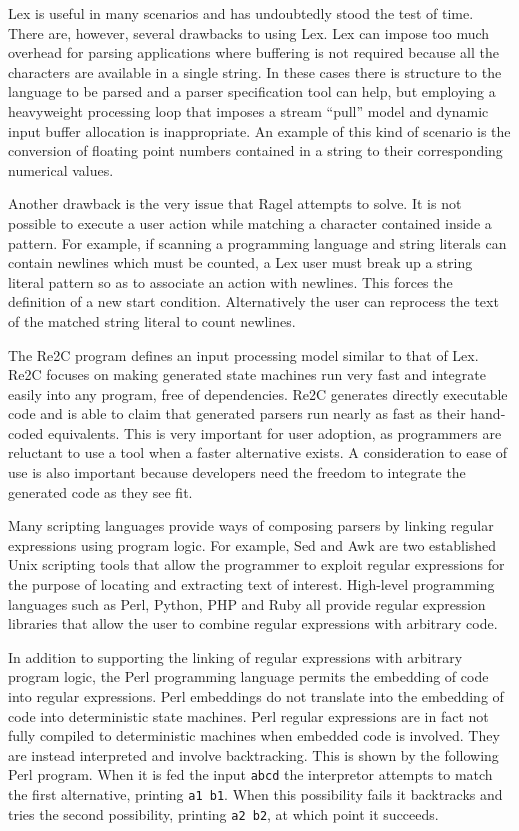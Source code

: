 \documentclass[letterpaper,11pt,oneside]{book}
\begin{document}
Lex is useful in many scenarios and has undoubtedly stood the test of time.
There are, however, several drawbacks to using Lex.  Lex can impose too much
overhead for parsing applications where buffering is not required because all
the characters are available in a single string.  In these cases there is
structure to the language to be parsed and a parser specification tool can
help, but employing a heavyweight processing loop that imposes a stream
``pull'' model and dynamic input buffer allocation is inappropriate.  An
example of this kind of scenario is the conversion of floating point numbers
contained in a string to their corresponding numerical values.

Another drawback is the very issue that Ragel attempts to solve.
It is not possible to execute a user action while
matching a character contained inside a pattern. For example, if scanning a
programming language and string literals can contain newlines which must be
counted, a Lex user must break up a string literal pattern so as to associate
an action with newlines. This forces the definition of a new start condition.
Alternatively the user can reprocess the text of the matched string literal to
count newlines. 


The Re2C program defines an input processing model similar to that of Lex.
Re2C focuses on making generated state machines run very fast and
integrate easily into any program, free of dependencies.  Re2C generates
directly executable code and is able to claim that generated parsers run nearly
as fast as their hand-coded equivalents.  This is very important for user
adoption, as programmers are reluctant to use a tool when a faster alternative
exists.  A consideration to ease of use is also important because developers
need the freedom to integrate the generated code as they see fit. 

Many scripting languages provide ways of composing parsers by linking regular
expressions using program logic. For example, Sed and Awk are two established
Unix scripting tools that allow the programmer to exploit regular expressions
for the purpose of locating and extracting text of interest. High-level
programming languages such as Perl, Python, PHP and Ruby all provide regular
expression libraries that allow the user to combine regular expressions with
arbitrary code.

In addition to supporting the linking of regular expressions with arbitrary
program logic, the Perl programming language permits the embedding of code into
regular expressions. Perl embeddings do not translate into the embedding of
code into deterministic state machines. Perl regular expressions are in fact
not fully compiled to deterministic machines when embedded code is involved.
They are instead interpreted and involve backtracking. This is shown by the
following Perl program. When it is fed the input \verb|abcd| the interpretor
attempts to match the first alternative, printing \verb|a1 b1|.  When this
possibility fails it backtracks and tries the second possibility, printing
\verb|a2 b2|, at which point it succeeds.
\end{document}
